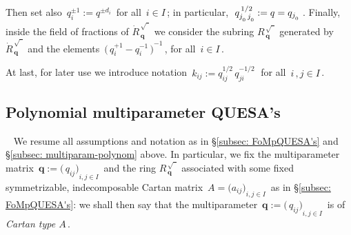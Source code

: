 \documentclass[12pt,reqno,twoside,a4paper]{amsart}
\numberwithin{equation}{section}
\theoremstyle{definition}
\newtheorem{free text}[lema]{}
\theoremstyle{remark}
\def \bq {\mathbf{q}}
\def \dotRbq {{\dot{R}_{\,\bq}}}
\def \Rbqsq {{R_{\,\bq}^{\,\scriptscriptstyle {\sqrt{\phantom{I}}}}}}
\def \dotRbqsq {{\dot{R}_{\,\bq}^{\,\scriptscriptstyle {\sqrt{\phantom{I}}}}}}
\theoremstyle{plain}
\begin{document}
%
 Then set also  $ \, q_i^{\pm 1} := q^{\pm d_i} \, $  for all  $ \, i \in I \, $;
 in particular,  $ \; q_{j_{\raise-2pt\hbox{$ \scriptscriptstyle 0 $}}
 \, j_{\raise-2pt\hbox{$ \scriptscriptstyle 0 $}}}^{\,1/2} := q =
 q_{j_{\raise-2pt\hbox{$ \scriptscriptstyle 0 $}}} \; $.  Finally,
 inside the field of fractions of  $ \dotRbqsq $  we consider the subring
 $ \Rbqsq $  generated by  $ \dotRbqsq $  and the elements
 $ \, {\big(\, q_i^{+1} - q_i^{-1} \,\big)}^{-1} \, $,  for all  $ \, i \in I \, $.
                                                       \par
   At last, for later use we introduce notation
   $ \, k_{ij} := q_{ij}^{1/2} \, q_{ji}^{-1/2} \; $  for all  $ \, i \, , j \in I \, $.

\vskip21pt


\subsection{Polynomial multiparameter QUESA's}  \label{subsec: polyn-MpQUESA's}
%
 {\ }
%
 \vskip9pt
%
   We resume all assumptions and notation as in  \S \ref{subsec: FoMpQUESA's}
   and  \S \ref{subsec: multiparam-polynom}  above.  In particular,
   we fix the multiparameter matrix  $ \, \bq := {\big(\, q_{ij} \big)}_{i,j \in I} \, $
   and the ring  $ \Rbqsq $  associated with some fixed symmetrizable,
   indecomposable Cartan matrix  $ \, A = {\big( a_{ij} \big)}_{i,j \in I} \, $
   as in  \S \ref{subsec: FoMpQUESA's}:  we shall then say that the multiparameter
   $ \, \bq := {\big(\, q_{ij} \big)}_{i,j \in I} \, $  is of  \textsl{Cartan type  $ A \, $}.

\vskip9pt
\end{document}
